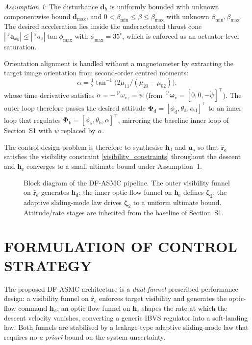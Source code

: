 \textit{Assumption 1}: The disturbance $\boldsymbol{d}_h$ is uniformly bounded with unknown componentwise bound $\boldsymbol{d}_{\max}$, and $0<\beta_{\min}\le\beta\le\beta_{\max}$ with unknown $\beta_{\min},\beta_{\max}$. The desired acceleration lies inside the underactuated thrust cone $|\,^\mathcal{I}\boldsymbol{a}_{xy}|\le|\,^\mathcal{I}a_z|\tan\phi_{\max}$ with $\phi_{\max}=35^\circ$, which is enforced as an actuator-level saturation.

Orientation alignment is handled without a magnetometer by extracting the target image orientation from second-order centred moments:
\begin{equation} \label{target orientation: equation}
    \alpha = \tfrac12\tan^{-1}\!\big(2\mu_{11}/(\mu_{20}-\mu_{02})\big),
\end{equation}
whose time derivative satisfies $\dot{\alpha} = -\,^\mathcal{V}\omega_{\text{v}z}=\dot{\psi}$ (from $\,^\mathcal{V}\boldsymbol{\omega}_\text{v}=[0,0,-\dot{\psi}]^\top$). The outer loop therefore passes the desired attitude $\boldsymbol{\Phi}_\text{d}=[\phi_\text{d},\theta_\text{d},\alpha_\text{d}]^\top$ to an inner loop that regulates $\boldsymbol{\Phi}_\text{b}=[\phi_\text{b},\theta_\text{b},\alpha]^\top$, mirroring the baseline inner loop of Section~S1 with $\psi$ replaced by $\alpha$.

The control-design problem is therefore to synthesise $\boldsymbol{h}_\text{d}$ and $\boldsymbol{u}_\text{a}$ so that $\hat{\boldsymbol{r}}_\text{e}$ satisfies the visibility constraint \eqref{visibility_constraints} throughout the descent and $\boldsymbol{h}_\text{e}$ converges to a small ultimate bound under Assumption~1.

\begin{figure}[hbt!]
\centering
    \resizebox{\textwidth}{!}{}
    \caption{Block diagram of the DF-ASMC pipeline. The outer visibility funnel on $\hat{\boldsymbol{r}}_\text{e}$ generates $\boldsymbol{h}_\text{d}$; the inner optic-flow funnel on $\boldsymbol{h}_\text{e}$ defines $\boldsymbol{\zeta}_2$; the adaptive sliding-mode law drives $\boldsymbol{\zeta}_2$ to a uniform ultimate bound. Attitude/rate stages are inherited from the baseline of Section~S1.}
    \label{block diagram: figure}
\end{figure}

\section{FORMULATION OF CONTROL STRATEGY} \label{control strategy: section}
The proposed DF-ASMC architecture is a \emph{dual-funnel} prescribed-performance design: a visibility funnel on $\hat{\boldsymbol{r}}_\text{e}$ enforces target visibility and generates the optic-flow command $\boldsymbol{h}_\text{d}$; an optic-flow funnel on $\boldsymbol{h}_\text{e}$ shapes the rate at which the descent velocity vanishes, converting a generic IBVS regulator into a soft-landing law. Both funnels are stabilised by a leakage-type adaptive sliding-mode law that requires no \emph{a priori} bound on the system uncertainty.

